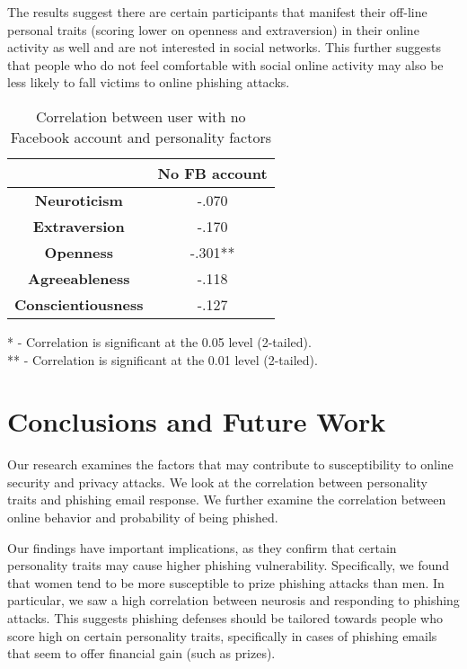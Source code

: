 \documentclass{sig-alternate}
\begin{document}
The results suggest there are certain participants that manifest their off-line personal traits (scoring lower on openness and extraversion) in their online activity as well and are not interested in social networks. This further suggests that people who do not feel comfortable with social online activity may also be less likely to fall victims to online phishing attacks.


\begin{table}
\begin{center}
\begin{tabular}{|c|c|}
\hline
&  \textbf{No FB account} \\
\hline
\hline
\textbf{Neuroticism} & -.070\\		
\hline
\textbf{Extraversion} & -.170\\
\hline
\textbf{Openness} & -.301**\\
\hline
\textbf{Agreeableness} & -.118\\
\hline
\textbf{Conscientiousness} & -.127\\
\hline

\end{tabular}

\vspace{5mm}
* - Correlation is significant at the 0.05 level (2-tailed).\\
** - Correlation is significant at the 0.01 level (2-tailed).\\

\caption{Correlation between user with no Facebook account and personality factors}
\label{NoFBUsers}
\end{center}
\end{table}

\section{Conclusions and Future Work}
\label{sec:conclusions}

Our research examines the factors that may contribute to susceptibility to online security and privacy attacks. We look at the correlation between personality traits and phishing email response. We further examine the correlation between online behavior and probability of being phished.

Our findings have important implications, as they confirm that certain personality traits may cause higher phishing vulnerability. Specifically, we found that women tend to be more susceptible to prize phishing attacks than men. In particular, we saw a high correlation between neurosis and responding to phishing attacks. This suggests phishing defenses should be tailored towards people who score high on certain personality traits, specifically in cases of phishing emails that seem to offer financial gain (such as prizes). 
\end{document}
